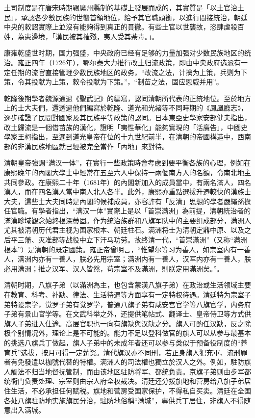 土司制度是在唐宋時期羈縻州縣制的基礎上發展而成的，其實質是「以土官治土民」，承認各少數民族的世襲首領地位，給予其官職頭銜，以進行間接統治，朝廷中央的敕詔實際上並沒有能夠得到真正的貫徹。有些土官以世襲故，恣肆虐殺百姓，為患邊境，「漢民被其摧殘，夷人受其荼毒。」。

康雍乾盛世时期，国力强盛，中央政府已经有足够的力量加强对少数民族地区的统治。雍正四年（1726年），鄂尔泰大力推行改土归流政策，即由中央政府选派有一定任期的流官直接管理少数民族地区的政务，“改流之法，计擒为上策，兵剿为下策，令其投献为上策，敕令投献为下策。”，“制苗之法，固应恩威并用”。

乾隆後期學者魏源通過《聖武記》的編寫，認同清朝所代表的正統地位。至於地方上的士大夫們，還透過他們編寫於乾隆、道光和光緒等不同時期的《鳳凰廳志》，逐步確證了民間對國家及其民族平等政策的認同。日本東亞史學家安部健夫指出，改土歸流是一個借苗族的漢化，證明「夷性華化」能夠實現的「活廣告」，中國史學家王柯指出，至遲到道光皇帝在位的十九世紀前半，在清朝的帝國構造中，西南部的非漢民族地區就已經被完全當作「內地」來對待。

清朝皇帝強調“满汉一体”，在實行一些政策時會考慮到要平衡各族的心理，例如在康熙晚年的內閣大學士中經常在五至六人中保持一兩個南方人的名額，令南北地主共同參政。在康熙二十年（1681年）的內閣新加入的成員當中，有兩名滿人，四名漢人，而在四名漢人當中南人北人各半。此外，康熙亦重點選拔升遷較快的漢族士大夫，這些士大夫同時是內閣的候補成員，亦容許有「反清」思想的學者嚴繩孫擔任官職。有學者指出，“满汉一体”實際上是以「首崇满洲」為前提，清朝統治者的滿漢畛域觀念始終根深蒂固。作为统治族群和八旗军队中的主要组成部分，满洲人尤其被清朝历代君主视为国家根本、朝廷柱石。满洲将士为清朝定鼎中原、以及之后平三藩、灭准部等战役中立下汗马功劳。故终清一代，“首崇滿洲”（又称“满洲根本”）是清朝的既定國策。雍正帝曾明言，“惟望尔等习为善人，如宗室内有一善人，满洲内亦有一善人，朕必先用宗室；满洲内有一善人，汉军内亦有一善人，朕必用满洲；推之汉军、汉人皆然，苟宗室不及滿洲，則朕定用滿洲矣。”。

清朝时期，八旗子弟（以滿洲為主，也包含蒙漢八旗子弟）在政治或生活领域主要在教育、科考、补缺、律法、生活待遇等方面享有一定特权待遇。清廷特为宗室子弟特设宗学，觉罗子弟有觉罗学，普通八旗子弟有咸安宫官学等八旗官学，内务府子弟有景山官学等。在文武科举之外，还提供笔帖式、翻译士、皇帝侍卫等方式供旗人子弟进入仕途。高层官职也一向有旗缺與汉缺之分。旗人可酌任汉缺，反之除极个别情况外，理论上是不可能的。能力不足以登科做官的旗人可以从参与最基本的挑选八旗兵丁做起，旗人子弟中的未成年者还可以参与类似于预备役制度的“养育兵”选拔，按月可得一定薪资。清代旗汉亦不同刑，若正身旗人犯充軍、流刑罪者有免發遣以枷號代替的特權。满洲人的司法權也獨立於汉人之外。例如，駐防旗人觸法不归当地督抚管制，而由该地区驻防将军、都统负责。京旗子弟则由步军都统衙门负责处理、宗室则由宗人府全权裁决。清廷还分拨旗地和营房给八旗子弟居住生活，不必承担任何赋税。旗地和营房受国家保护，不得私自买卖。清廷在全国各处八旗驻防地实施旗民分治，駐防地俗稱“满城”，專供兵丁居住，非旗人不得随意出入满城。

